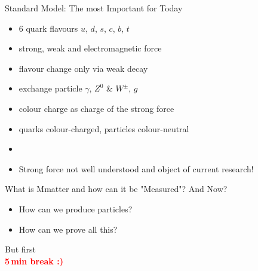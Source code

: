 \begin{frame}{Standard Model: The most Important for Today}
\begin{itemize}
    \item 6 quark flavours $u$, $d$, $s$, $c$, $b$, $t$
    \item strong, weak and electromagnetic force
    \item flavour change only via weak decay
    \item exchange particle $\gamma$, $Z^0$ \& $W^{\pm}$, $g$
    \item colour charge as charge of the strong force
    \item quarks colour-charged, particles colour-neutral
    \item []
    \item[\ding{43}] Strong force not well understood and object of current research!
\end{itemize}
    
\end{frame}
  \begin{frame}{What is Mmatter and how can it be "Measured"?}\Large
 And Now?
 \begin{itemize}
     \item How can we produce particles?
     \item How can we prove all this?
 \end{itemize}
\begin{center} \pause
 
But first \\ \textbf{\textcolor{red}{5\,min break :)}
}
\end{center}  
\end{frame}
